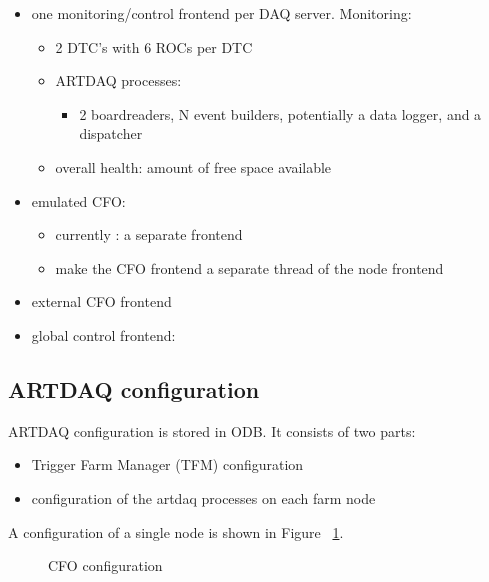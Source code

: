 \begin{itemize}
\item
  one monitoring/control frontend per DAQ server. Monitoring:
  \begin{itemize}
  \item
    2 DTC's with 6 ROCs per DTC
  \item
    ARTDAQ processes:
    \begin{itemize}
    \item
      2 boardreaders, N event builders, potentially a data logger, and a dispatcher
    \end{itemize}
  \item
    overall health: amount of free space available
  \end{itemize}
\item
  emulated CFO:
  \begin{itemize}
  \item
    currently : a separate frontend 
  \item 
    make the CFO frontend a separate thread of the node frontend
  \end{itemize}
\item
  external CFO frontend 
\item
  global control frontend:
\end{itemize}

\subsection{ARTDAQ configuration}

ARTDAQ configuration is stored in ODB. It consists of two parts:
\begin{itemize}
\item
  Trigger Farm Manager (TFM) configuration
\item
  configuration of the artdaq processes on each farm node
\end{itemize}

A configuration of a single node is shown in Figure ~\ref{figure:artdaq_configuration}.

\begin{figure}[H]
  \caption{
    \label{figure:artdaq_configuration}
    CFO configuration
  }
\end{figure}

